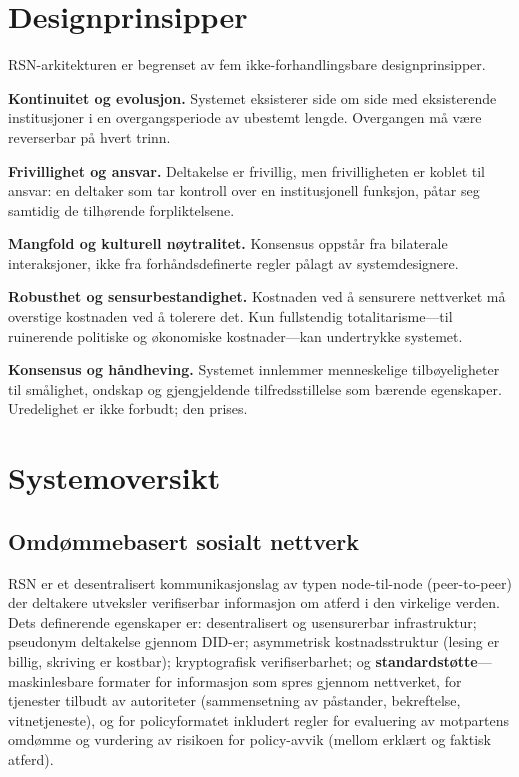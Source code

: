 \documentclass[11pt,a4paper,twocolumn]{article}
\begin{document}
\section{Designprinsipper}

RSN-arkitekturen er begrenset av fem ikke-forhandlingsbare designprinsipper.

\textbf{Kontinuitet og evolusjon.} Systemet eksisterer side om side med eksisterende institusjoner i en overgangsperiode av ubestemt lengde. Overgangen må være reverserbar på hvert trinn.

\textbf{Frivillighet og ansvar.} Deltakelse er frivillig, men frivilligheten er koblet til ansvar: en deltaker som tar kontroll over en institusjonell funksjon, påtar seg samtidig de tilhørende forpliktelsene.

\textbf{Mangfold og kulturell nøytralitet.} Konsensus oppstår fra bilaterale interaksjoner, ikke fra forhåndsdefinerte regler pålagt av systemdesignere.

\textbf{Robusthet og sensurbestandighet.} Kostnaden ved å sensurere nettverket må overstige kostnaden ved å tolerere det. Kun fullstendig totalitarisme---til ruinerende politiske og økonomiske kostnader---kan undertrykke systemet.

\textbf{Konsensus og håndheving.} Systemet innlemmer menneskelige tilbøyeligheter til smålighet, ondskap og gjengjeldende tilfredsstillelse som bærende egenskaper. Uredelighet er ikke forbudt; den prises.

\section{Systemoversikt}

\subsection{Omdømmebasert sosialt nettverk}

RSN er et desentralisert kommunikasjonslag av typen node-til-node (peer-to-peer) der deltakere utveksler verifiserbar informasjon om atferd i den virkelige verden. Dets definerende egenskaper er: desentralisert og usensurerbar infrastruktur; pseudonym deltakelse gjennom DID-er; asymmetrisk kostnadsstruktur (lesing er billig, skriving er kostbar); kryptografisk verifiserbarhet; og \textbf{standardstøtte}---maskinlesbare formater for informasjon som spres gjennom nettverket, for tjenester tilbudt av autoriteter (sammensetning av påstander, bekreftelse, vitnetjeneste), og for policyformatet inkludert regler for evaluering av motpartens omdømme og vurdering av risikoen for policy-avvik (mellom erklært og faktisk atferd).
\end{document}

